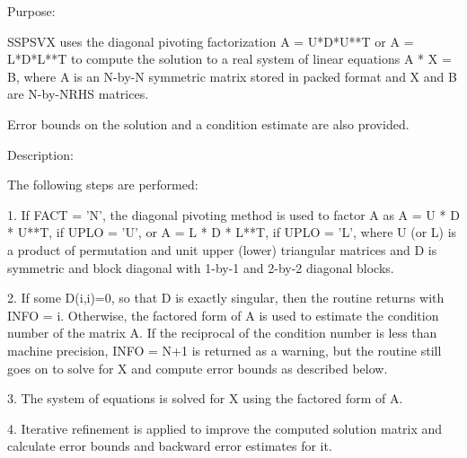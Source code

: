  \begin{DoxyParagraph}{Purpose\+: }
\begin{DoxyVerb} SSPSVX uses the diagonal pivoting factorization A = U*D*U**T or
 A = L*D*L**T to compute the solution to a real system of linear
 equations A * X = B, where A is an N-by-N symmetric matrix stored
 in packed format and X and B are N-by-NRHS matrices.

 Error bounds on the solution and a condition estimate are also
 provided.\end{DoxyVerb}
 
\end{DoxyParagraph}
\begin{DoxyParagraph}{Description\+: }
\begin{DoxyVerb} The following steps are performed:

 1. If FACT = 'N', the diagonal pivoting method is used to factor A as
       A = U * D * U**T,  if UPLO = 'U', or
       A = L * D * L**T,  if UPLO = 'L',
    where U (or L) is a product of permutation and unit upper (lower)
    triangular matrices and D is symmetric and block diagonal with
    1-by-1 and 2-by-2 diagonal blocks.

 2. If some D(i,i)=0, so that D is exactly singular, then the routine
    returns with INFO = i. Otherwise, the factored form of A is used
    to estimate the condition number of the matrix A.  If the
    reciprocal of the condition number is less than machine precision,
    INFO = N+1 is returned as a warning, but the routine still goes on
    to solve for X and compute error bounds as described below.

 3. The system of equations is solved for X using the factored form
    of A.

 4. Iterative refinement is applied to improve the computed solution
    matrix and calculate error bounds and backward error estimates
    for it.\end{DoxyVerb}
 
\end{DoxyParagraph}

